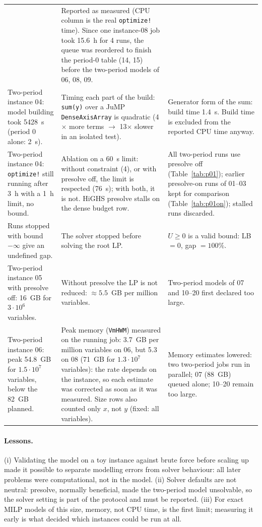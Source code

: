 \documentclass[11pt,a4paper]{article}
\begin{document}
\begin{table}[H]
\begin{tabularx}{\textwidth}{@{}>{\raggedright\arraybackslash}p{3.6cm}>{\raggedright\arraybackslash}X>{\raggedright\arraybackslash}X@{}}
& Reported as measured (CPU column is the real \texttt{optimize!} time). Since one instance-08 job took 15.6~h for
4 runs, the queue was reordered to finish the period-0 table (14, 15) before the two-period models of 06, 08, 09. \\
Two-period instance 04: model building took 5428~s (period 0 alone: 2~s).
& Timing each part of the build: \texttt{sum(y)} over a JuMP \texttt{DenseAxisArray} is quadratic (4$\times$ more
terms $\to$ 13$\times$ slower in an isolated test).
& Generator form of the sum: build time 1.4~s. Build time is excluded from the reported CPU time anyway. \\
Two-period instance 04: \texttt{optimize!} still running after 3~h with a 1~h limit, no bound.
& Ablation on a 60~s limit: without constraint (4), or with presolve off, the limit is respected (76~s); with both, it is not.
HiGHS presolve stalls on the dense budget row.
& All two-period runs use presolve off (Table~\ref{tab:p01}); earlier presolve-on runs of 01--03 kept for comparison
(Table~\ref{tab:p01on}); stalled runs discarded. \\
Runs stopped with bound $-\infty$ give an undefined gap.
& The solver stopped before solving the root LP.
& $U\ge0$ is a valid bound: LB $=0$, gap $=100\%$. \\
Two-period instance 05 with presolve off: 16~GB for $3\cdot10^6$ variables.
& Without presolve the LP is not reduced: $\approx5.5$~GB per million variables.
& Two-period models of 07 and 10--20 first declared too large. \\
Two-period instance 06: peak 54.8~GB for $1.5\cdot10^7$ variables, below the 82~GB planned.
& Peak memory (\texttt{VmHWM}) measured on the running job: 3.7~GB per million variables on 06, but 5.3 on 08
(71~GB for $1.3\cdot10^7$ variables): the rate depends on the instance, so each estimate was corrected as soon as it was measured.
Size rows also counted only $x$, not $y$ (fixed: all variables).
& Memory estimates lowered: two two-period jobs run in parallel; 07 (88~GB) queued alone; 10--20 remain too large. \\
\bottomrule
\end{tabularx}
\end{table}

\paragraph{Lessons.} (i) Validating the model on a toy instance against brute force before scaling up made it possible
to separate modelling errors from solver behaviour: all later problems were computational, not in the model.
(ii) Solver defaults are not neutral: presolve, normally beneficial, made the two-period model unsolvable, so the
solver setting is part of the protocol and must be reported. (iii) For exact MILP models of this size, memory, not
CPU time, is the first limit; measuring it early is what decided which instances could be run at all.
\end{document}
